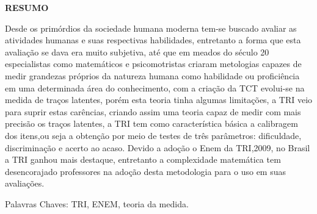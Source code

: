 \begin{center}
	    \textbf{RESUMO}
	\end{center}
	
	Desde os primórdios da sociedade humana moderna tem-se buscado avaliar as atividades humanas e suas respectivas habilidades, entretanto a forma que esta avaliação se dava era muito subjetiva, até que em meados do século 20 especialistas como matemáticos e psicomotristas criaram metologias capazes de medir grandezas próprios da natureza humana como habilidade ou proficiência em uma determinada área do conhecimento, com a criação da TCT evolui-se na medida de traços latentes, porém esta teoria tinha algumas limitações, a TRI veio para suprir estas carências, criando assim uma teoria capaz de medir com mais precisão os traços latentes, a TRI tem como característica básica a calibragem dos itens,ou seja a obtenção por meio de testes de três parâmetros: dificuldade, discriminação e acerto ao acaso. Devido a adoção o Enem da TRI,2009, no Brasil a TRI ganhou mais destaque, entretanto a complexidade matemática tem desencorajado professores na adoção desta metodologia para o uso em suas avaliações.
	\par
	\noindent Palavras Chaves: TRI, ENEM, teoria da medida.
	\newpage